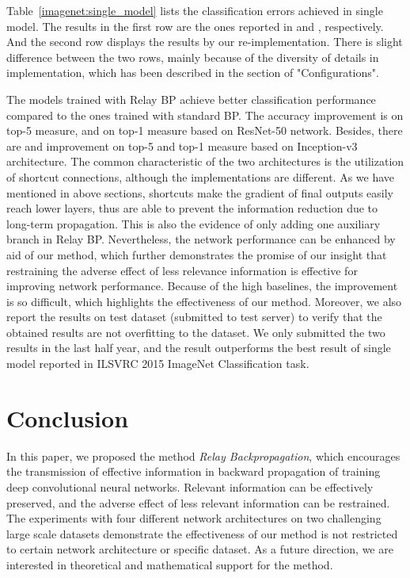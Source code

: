 \documentclass[runningheads]{llncs}
\begin{document}
Table~\ref{imagenet:single_model} lists the classification errors achieved in single model. The results in the first row are the ones reported in \cite{he_cvpr2016} and \cite{szegedy_2015}, respectively. And the second row displays the results by our re-implementation. There is slight difference between the two rows, mainly because of the diversity of details in implementation, which has been described in the section of "Configurations".

The models trained with Relay BP achieve better classification performance compared to the ones trained with standard BP. The accuracy improvement is  on top-5 measure, and  on top-1 measure based on ResNet-50 network. Besides, there are  and  improvement on top-5 and top-1 measure based on Inception-v3 architecture. The common characteristic of the two architectures is the utilization of shortcut connections, although the implementations are different. As we have mentioned in above sections, shortcuts make the gradient of final outputs easily reach lower layers, thus are able to prevent the information reduction due to long-term propagation. This is also the evidence of only adding one auxiliary branch in Relay BP. Nevertheless, the network performance can be enhanced by aid of our method, which further demonstrates the promise of our insight that restraining the adverse effect of less relevance information is effective for improving network performance. Because of the high baselines, the improvement is so difficult, which highlights the effectiveness of our method. Moreover, we also report the results on test dataset (submitted to test server) to verify that the obtained results are not overfitting to the dataset. We only submitted the two results in the last half year, and the result  outperforms the best result of single model reported in ILSVRC 2015 ImageNet Classification task.


\section{Conclusion}
In this paper, we proposed the method {\it Relay Backpropagation}, which encourages the transmission of effective information in backward propagation of training deep convolutional neural networks. Relevant information can be effectively preserved, and the adverse effect of less relevant information can be restrained. The experiments with four different network architectures on two challenging large scale datasets demonstrate the effectiveness of our method is not restricted to certain network architecture or specific dataset. As a future direction, we are interested in theoretical and mathematical support for the method.



\end{document}

